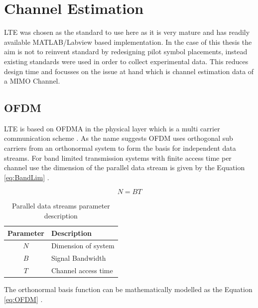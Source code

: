 \chapter{Channel Estimation}
\label{ch:ChEst}

LTE was chosen as the standard to use here as it is very mature and has readily available MATLAB/Labview based implementation. In the case of this thesis the aim is not to reinvent standard by redesigning pilot symbol placements, instead existing standards were used in order to collect experimental data. This reduces design time and focusses on the issue at hand which is channel estimation data of a MIMO Channel.

\section{OFDM}\label{sec:OFDM}
LTE is based on OFDMA in the physical layer which is a multi carrier communication scheme \cite{FazelKaiser}. As the name suggests OFDM uses orthogonal sub carriers from an orthonormal system to form the basis for independent data streams. For band limited transmission systems with finite access time per channel use the dimension of the parallel data stream is given by the Equation \ref{eq:BandLim}  \cite{UtschickOFDM}.

        \begin{equation} \label{eq:BandLim}
            N = BT
        \end{equation}

        \begin{table}[H]
            \begin{center}
                \begin{tabular}{|c|l|}
                    \hline
                    Parameter& Description\\ \hline
                    $N$& Dimension of system \\ \hline
                    $B$& Signal Bandwidth \\ \hline
                    $T$& Channel access time \\
                    \hline
                \end{tabular}
                \caption{Parallel data streams parameter description}
                \label{tab:BandLimTrans}
            \end{center}
        \end{table}

The orthonormal basis function can be mathematically modelled as the Equation \ref{eq:OFDM} \cite{UtschickOFDM}.

